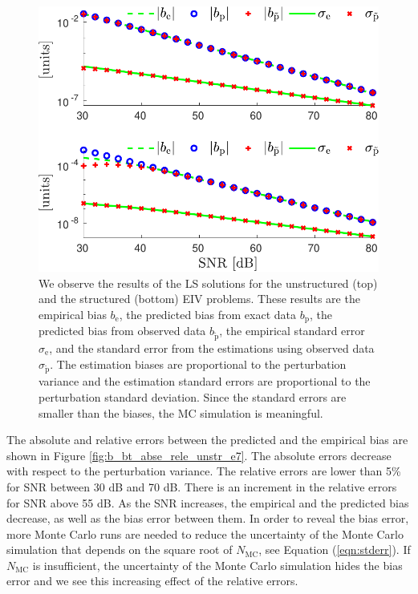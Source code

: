 \begin{figure}[htb!]
 \centering
 \includegraphics[width=1\columnwidth]{./ChapterStatisticalAnalysis/fig/Fig_1.pdf} 
  \caption{ \label{bias_sigma_NMC_unstr_str_n2} 
  We observe the results of the LS solutions for the unstructured (top) and the structured (bottom) EIV problems. These results are the empirical bias $b_{\mathrm{e}}$, the predicted bias from exact data $b_{\mathrm{p}}$, the predicted bias from observed data $b_{\widetilde{\mathrm{p}}}$, the empirical standard error $\sigma_{\mathrm{e}}$, and the standard error from the estimations using observed data $\sigma_{\widetilde{\mathrm{p}}}$. The estimation biases are proportional to the perturbation variance and the estimation standard errors are proportional to the perturbation standard deviation. Since the standard errors are smaller than the biases, the MC simulation is meaningful. }
\end{figure}

The absolute and relative errors between the predicted and the empirical bias are shown in Figure \ref{fig:b_bt_abse_rele_unstr_e7}. 
The absolute errors decrease with respect to the perturbation variance.
The relative errors are lower than 5\% for SNR between 30 dB and 70 dB. 
There is an increment in the relative errors for SNR above 55 dB. 
 As the SNR increases, the empirical and the predicted bias decrease, as well as the bias error between them.
In order to reveal the bias error, more Monte Carlo runs are needed to reduce the uncertainty of the Monte Carlo simulation that depends on the square root of $N_{\mathrm{MC}}$, see Equation (\ref{eqn:stderr}).
If $N_{\mathrm{MC}}$ is insufficient, the uncertainty of the Monte Carlo simulation hides the bias error and we see this increasing effect of the relative errors. 

